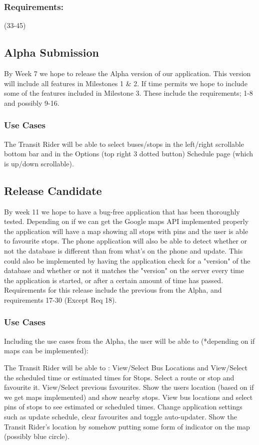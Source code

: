 \documentclass[a4paper,12pt]{article}
\begin{document}
\subsubsection{Requirements:} (33-45)
\pagebreak
\subsection{Alpha Submission}
By Week 7 we hope to release the Alpha
version of our application. This version will include all features in Milestones 1 \& 2. If time permits we hope to include some of the features included in Milestone 3. These include the requirements; 1-8 and possibly 9-16. 

\subsubsection{Use Cases}
The Transit Rider will be able to select buses/stops in the left/right scrollable bottom bar and in the Options (top right 3 dotted button) Schedule  page (which is up/down scrollable). 

\subsection{Release Candidate}
By week 11 we hope to have a bug-free application that has been thoroughly tested. Depending on if we can get the Google maps API implemented properly the application will have a map showing all stops with pins and the user is able to favourite stops. The phone application will also be able to detect whether or not the database is different than from what's on the phone and update. This could also be implemented by having the application check for a "version" of the database and whether or not it matches the "version" on the server every time the application is started, or after a certain amount of time has passed. Requirements for this release include the previous from the Alpha, and requirements 17-30 (Except Req 18).

\subsubsection{Use Cases}
Including the use cases from the Alpha, the user will be able to (*depending on if maps can be implemented):

The Transit Rider will be able to :
View/Select Bus Locations and View/Select the scheduled time or estimated times for Stops. Select a route or stop and favourite it. View/Select previous favourites. Show the users location (based on if we get maps implemented) and show nearby stops. 
View bus locations and select pins of stops to see estimated or scheduled times.
Change application settings such as update schedule, clear favourites and toggle auto-updater.
Show the Transit Rider's location by somehow putting some form of indicator on the map (possibly blue circle). 
\end{document}
